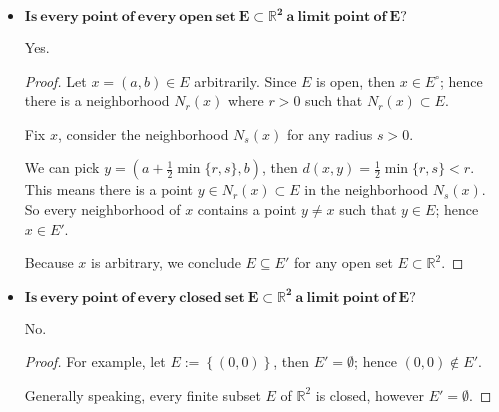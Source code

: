 \begin{Exercise}
\begin{itemize}
\item $\mathbf{Is\ every\ point\ of\ every\ open\ set\ E \subset \mathbb{R}^2\ a\ limit\ point\ of\ E?}$
\begin{answer}
Yes.
\end{answer}
\begin{proof}
Let $x = (a, b)\in E$ arbitrarily. Since $E$ is open, then $x\in E^{\circ}$; hence there is a neighborhood $N_r(x)$ where $r>0$ such that $N_r(x)\subset E$.

Fix $x$, consider the neighborhood $N_s(x)$ for any radius $s>0$. 

We can pick $y = \left( a+\frac{1}{2}\min\{r,s\}, b \right)$, then $d(x,y) = \frac{1}{2}\min\{r,s\} < r$. This means there is a point $y\in N_r(x) \subset E$ in the neighborhood $N_s(x)$. So every neighborhood of $x$ contains a point $y\neq x$ such that $y\in E$; hence $x\in E'$.

Because $x$ is arbitrary, we conclude $E \subseteq E'$ for any open set $E\subset \mathbb{R}^2$.
\end{proof}

\item $\mathbf{Is\ every\ point\ of\ every\ closed\ set\ E \subset \mathbb{R}^2\ a\ limit\ point\ of\ E?}$
\begin{answer}
No.
\end{answer}
\begin{proof}
For example, let $E := \left\{ (0,0) \right\}$, then $E' = \emptyset$; hence $(0,0)\notin E'$.

Generally speaking, every finite subset $E$ of $\mathbb{R}^2$ is closed, however $E' = \emptyset$. 
\end{proof}
\end{itemize}
\end{Exercise}